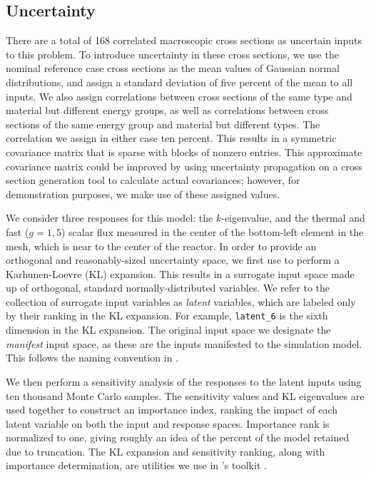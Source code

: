 \subsection{Uncertainty}
There are a total of 168 correlated macroscopic cross sections as uncertain inputs to this problem.  To
introduce uncertainty in these cross sections, we use the nominal reference case cross sections as the mean
values of Gaussian normal distributions, and assign a standard deviation of five percent of the mean to all 
inputs.  We also assign
correlations between cross sections of the same type and material but different energy groups, as well as
correlations between cross sections of the same energy group and material but different types.  The
correlation we assign in either case ten percent.  This results in a symmetric covariance matrix that is sparse with
blocks of nonzero entries.  This approximate covariance matrix could be improved by using uncertainty propagation
on a cross section generation tool to calculate actual covariances; however, for demonstration purposes, we
make use of
these assigned values.

We consider three responses for this model: the $k$-eigenvalue, and the thermal and fast ($g=1,5$) scalar 
flux measured in the center of the
bottom-left element in the mesh, which is near to the center of the reactor.  In order to provide an
orthogonal and reasonably-sized uncertainty space, we first use \raven{} \cite{raven} to perform a Karhunen-Loevre (KL) 
\cite{karhunen}
expansion.  This results in a surrogate input space made up of orthogonal, standard normally-distributed
variables.  We refer to the collection of surrogate input variables as \emph{latent} variables, which are
labeled only by their ranking in the KL expansion.  For example, \texttt{latent\_6} is the sixth dimension in
the KL expansion.  The original input space we designate the \emph{manifest} input space, as these are the
inputs manifested to the simulation model.  This follows the naming convention in \raven{}.

We then perform a sensitivity analysis of the responses to the latent inputs using ten thousand Monte Carlo samples.  
The sensitivity values and KL
eigenvalues are used together to construct an importance index, ranking the impact of each latent variable on
both the input and response spaces.  Importance rank is normalized to one, giving roughly an idea of the
percent of the model retained due to truncation.  The KL expansion and sensitivity ranking, along with importance
determination, are utilities we use in \raven{}'s toolkit \cite{physor2016}.  

